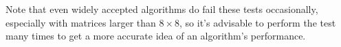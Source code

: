 \documentclass[conference]{IEEEtran}
\begin{document}
Note that even widely accepted algorithms do fail these tests occasionally, especially with matrices larger than $ 8 \times 8 $, so it's advisable to perform the test many times to get a more accurate idea of an algorithm's performance.


%
%



%
%
\end{document}
